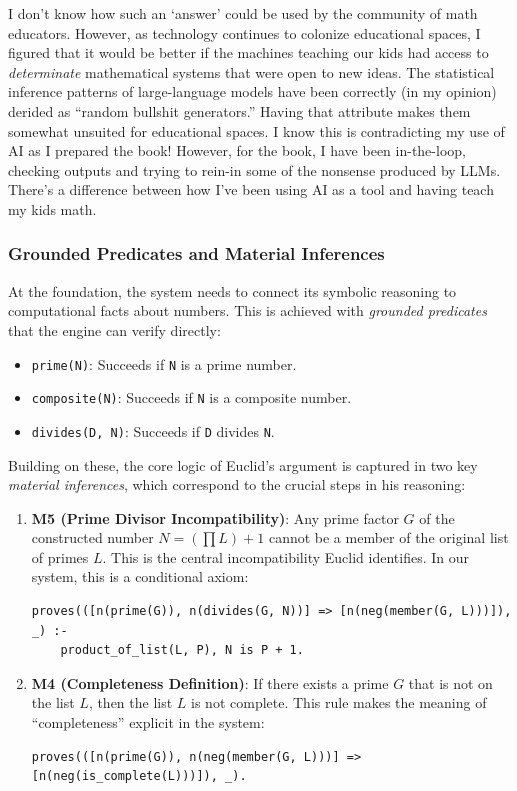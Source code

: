 \documentclass[12pt]{book}
\begin{document}
I don't know how such an `answer' could be used by the community of math educators. However, as technology continues to colonize educational spaces, I figured that it would be better if the machines teaching our kids had access to \textit{determinate} mathematical systems that were open to new ideas. The statistical inference patterns of large-language models have been correctly (in my opinion) derided as ``random bullshit generators.'' Having that attribute makes them somewhat unsuited for educational spaces. I know this is contradicting my use of AI as I prepared the book! However, for the book, I have been in-the-loop, checking outputs and trying to rein-in some of the nonsense produced by LLMs. There's a difference between how I've been using AI as a tool and having teach my kids math. 











\subsubsection{Grounded Predicates and Material Inferences}

At the foundation, the system needs to connect its symbolic reasoning to computational facts about numbers. This is achieved with \textit{grounded predicates} that the engine can verify directly:
\begin{itemize}
    \item \texttt{prime(N)}: Succeeds if \texttt{N} is a prime number.
    \item \texttt{composite(N)}: Succeeds if \texttt{N} is a composite number.
    \item \texttt{divides(D, N)}: Succeeds if \texttt{D} divides \texttt{N}.
\end{itemize}

Building on these, the core logic of Euclid's argument is captured in two key \textit{material inferences}, which correspond to the crucial steps in his reasoning:
\begin{enumerate}
    \item \textbf{M5 (Prime Divisor Incompatibility)}: Any prime factor $G$ of the constructed number $N = (\prod L) + 1$ cannot be a member of the original list of primes $L$. This is the central incompatibility Euclid identifies. In our system, this is a conditional axiom:
    \begin{verbatim}
proves(([n(prime(G)), n(divides(G, N))] => [n(neg(member(G, L)))]), _) :-
    product_of_list(L, P), N is P + 1.
    \end{verbatim}
    \item \textbf{M4 (Completeness Definition)}: If there exists a prime $G$ that is not on the list $L$, then the list $L$ is not complete. This rule makes the meaning of ``completeness'' explicit in the system:
    \begin{verbatim}
proves(([n(prime(G)), n(neg(member(G, L)))] => [n(neg(is_complete(L)))]), _).
    \end{verbatim}
\end{enumerate}
\end{document}
